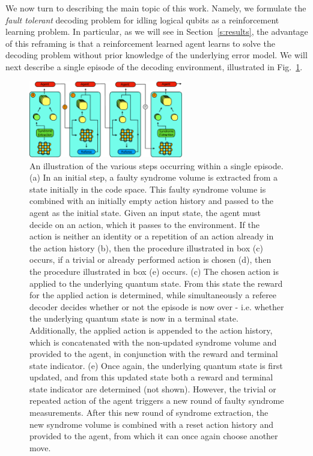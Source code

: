 \documentclass[twocolumn,preprintnumbers,amsmath,amssymb,notitlepage,nofootinbib,longbibliography,superscriptaddress,aps,pra,10pt]{revtex4-1}
\begin{document}
	We now turn to describing the main topic of this work. Namely, we formulate the \textit{fault tolerant} decoding problem for idling logical qubits as a reinforcement learning problem.
	In particular, as we will see in Section~\ref{s:results}, the advantage of this reframing is that a reinforcement learned agent learns to solve the decoding problem without prior
	knowledge of the underlying error model. We will next describe a single episode of the decoding environment, illustrated in Fig.~\ref{f:single_episode}.

	\begin{figure}
		\centering
		\includegraphics[width=0.6\textwidth]{figures/decoding_as_rl.pdf}
		\caption{
			An illustration of the various steps occurring within a single episode.
			(a) In an initial step, a faulty syndrome volume is extracted from a state initially in the code space.
			This faulty syndrome volume is combined with an initially empty action history and passed to the agent as the initial state.
			Given an input state, the agent must decide on an action, which it passes to the environment.
			If the action is neither an identity or a repetition of an action already in the action history (b), then the procedure illustrated in box (c) occurs, if a trivial or already performed action is chosen (d), then the procedure illustrated in box (e) occurs.
			(c) The chosen action is applied to the underlying quantum state.
			From this state the reward for the applied action is determined, while simultaneously a referee decoder decides whether or not the episode is now over - i.e.
			whether the underlying quantum state is now in a terminal state.
			Additionally, the applied action is appended to the action history, which is concatenated with the non-updated syndrome volume and provided to the agent, in conjunction with the reward and terminal state indicator.
			(e) Once again, the underlying quantum state is first updated, and from this updated state both a reward and terminal state indicator are determined (not shown).
			However, the trivial or repeated action of the agent triggers a new round of faulty syndrome measurements.
			After this new round of syndrome extraction, the new syndrome volume is combined with a reset action history and provided to the agent, from which it can once again choose another move.
		}
		\label{f:single_episode}
	\end{figure}
\end{document}
